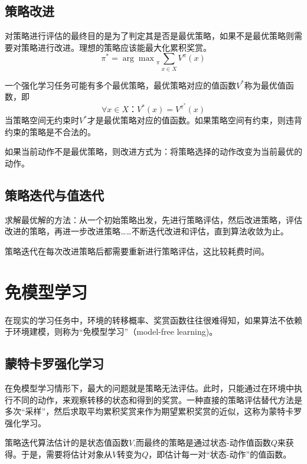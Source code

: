 \subsection{策略改进}

对策略进行评估的最终目的是为了判定其是否是最优策略，如果不是最优策略则需要对策略进行改进。理想的策略应该能最大化累积奖赏。
\begin{equation}
\pi^\ast={\arg\max}_\pi\sum_{x\in X}V^\pi(x)
\end{equation}

一个强化学习任务可能有多个最优策略，最优策略对应的值函数$V^\ast$称为最优值函数，即
\begin{equation}
\forall x\in X：V^\ast(x)=V^{\pi^\ast}(x)
\end{equation}
当策略空间无约束时$V^\ast$才是最优策略对应的值函数。如果策略空间有约束，则违背约束的策略是不合法的。

如果当前动作不是最优策略，则改进方式为：将策略选择的动作改变为当前最优的动作。

\subsection{策略迭代与值迭代}

求解最优解的方法：从一个初始策略出发，先进行策略评估，然后改进策略，评估改进的策略，再进一步改进策略……不断迭代改进和评估，直到算法收敛为止。

策略迭代在每次改进策略后都需要重新进行策略评估，这比较耗费时间。

\section{免模型学习}

在现实的学习任务中，环境的转移概率、奖赏函数往往很难得知，如果算法不依赖于环境建模，则称为``免模型学习''（model-free learning)。

\subsection{蒙特卡罗强化学习}

在免模型学习情形下，最大的问题就是策略无法评估。此时，只能通过在环境中执行不同的动作，来观察转移的状态和得到的奖赏。一种直接的策略评估替代方法是多次``采样''，然后求取平均累积奖赏来作为期望累积奖赏的近似，这称为蒙特卡罗强化学习。

策略迭代算法估计的是状态值函数$V$,而最终的策略是通过状态-动作值函数$Q$来获得。于是，需要将估计对象从$V$转变为$Q$，即估计每一对``状态-动作''的值函数。

